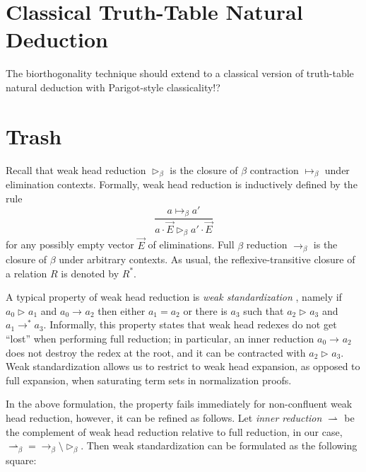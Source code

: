 \documentclass[a4paper,USenglish,cleveref, autoref, thm-restate]{lipics-v2019}
\newcommand{\ru}{\dfrac}
\newcommand{\contract}[1][]{\mapsto_{#1}}
\newcommand{\whd}[1][]{\rhd_{#1}}
\newcommand{\red}[1][]{\longrightarrow_{#1}}
\newcommand{\inner}[1][]{\rightharpoonup_{#1}}
\begin{document}
\section{Classical Truth-Table Natural Deduction}

The biorthogonality technique should extend to a classical version of
truth-table natural deduction with Parigot-style classicality!?



\clearpage

\appendix

\section{Trash}

Recall that weak head reduction $\whd[\beta]$ is the closure of
$\beta$ contraction $\contract[\beta]$ under elimination contexts.
Formally, weak head reduction is inductively defined by the rule
\[
  \ru{a \contract[\beta] a'
    }{a \cdot \vec E \whd[\beta] a' \cdot \vec E}
\]
for any possibly empty vector $\vec E$ of eliminations.
Full $\beta$ reduction $\red[\beta]$ is the closure of $\beta$ under
arbitrary contexts.  As usual, the reflexive-transitive closure of a
relation $R$ is denoted by $R^*$.

A typical property of weak head reduction is \emph{weak standardization}
\cite{alti:PhD}, namely if $a_0 \whd a_1$ and $a_0 \red a_2$ then
either $a_1 = a_2$ or there is $a_3$ such that $a_2 \whd a_3$ and $a_1 \red^* a_3$.
Informally, this property states that weak head redexes do not get
``lost'' when performing full reduction; in particular, an inner
reduction $a_0 \red a_2$ does not destroy the redex at the root, and
it can be contracted with $a_2 \whd a_3$.
Weak standardization allows us to restrict to weak head expansion, as opposed
to full expansion, when saturating term sets in normalization proofs.

In the above formulation, the property fails immediately for
non-confluent weak head reduction, however, it can be refined as
follows.  Let \emph{inner reduction} $\inner$ be the complement of weak head
reduction relative to full reduction, in our case,
${\inner[\beta]} = {\red[\beta]} \setminus {\whd[\beta]}$.
Then weak standardization can be formulated as the following square:
\end{document}

